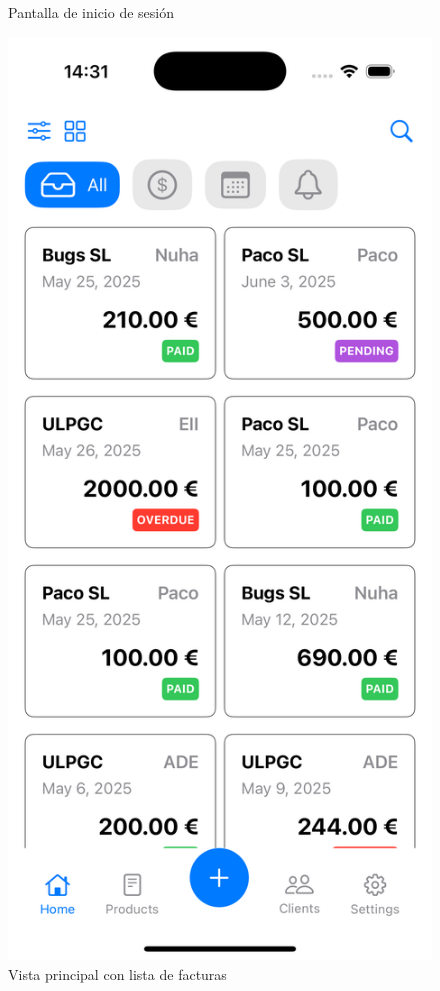 \begin{large}
\begin{figure}[H]
\begin{minipage}[t]{0.45\textwidth}
    \caption{Pantalla de inicio de sesión}
    \label{fig:ios_sign_in}
  \end{minipage}\hfill
  \begin{minipage}[t]{0.45\textwidth}
    \centering
    \includegraphics[width=\linewidth]{Ilustraciones/ios_homeview.png}
    \caption{Vista principal con lista de facturas}
    \label{fig:home_view}
  \end{minipage}
\end{figure}


\end{large}
